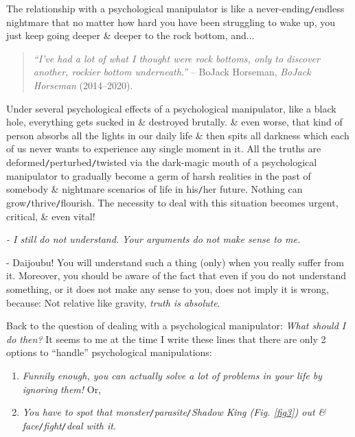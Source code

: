 \documentclass[12pt,twoside]{book}
\begin{document}
The relationship with a psychological manipulator is like a never-ending{\tt/}endless nightmare that no matter how hard you have been struggling to wake up, you just keep going deeper \& deeper to the rock bottom, and$\ldots$
\begin{quotation}
	{\it``I've had a lot of what I thought were rock bottoms, only to discover another, rockier bottom underneath.''} -- BoJack Horseman, {\it BoJack Horseman} (2014--2020).
\end{quotation}
Under several psychological effects of a psychological manipulator, like a black hole, everything gets sucked in \& destroyed brutally. \& even worse, that kind of person absorbs all the lights in our daily life \& then spits all darkness which each of us never wants to experience any single moment in it. All the truths are deformed{\tt/}perturbed{\tt/}twisted via the dark-magic mouth of a psychological manipulator to gradually become a germ of harsh realities in the past of somebody \& nightmare scenarios of life in his{\tt/}her future. Nothing can grow{\tt/}thrive{\tt/}flourish. The necessity to deal with this situation becomes urgent, critical, \& even vital!

{\it - I still do not understand. Your arguments do not make sense to me.}

- Daijoubu! You will understand such a thing (only) when you really suffer from it. Moreover, you should be aware of the fact that even if you do not understand something, or it does not make any sense to you, does not imply it is wrong, because: Not relative like gravity, {\it truth is absolute}.

Back to the question of dealing with a psychological manipulator: {\it What should I do then?} It seems to me at the time I write these lines that there are only 2 options to ``handle'' psychological manipulations:
\begin{enumerate}
	\item {\it Funnily enough, you can actually solve a lot of problems in your life by ignoring them!} Or,
	\item {\it You have to spot that monster{\tt/}parasite{\tt/}Shadow King (Fig. \ref{fig3}) out \& face{\tt/}fight{\tt/}deal with it.}
\end{enumerate}
\end{document}
